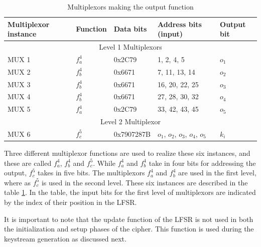 \begin{table}[ht!]
\begin{center}
\small{
\begin{tabular}{|p{2.2cm}|l|p{2cm}|p{2.8cm}|p{1.5cm}|}
\hline 
\textbf{Multiplexor instance}	& \textbf{Function}		& \textbf{Data bits}	& \textbf{Address bits (input)}		& \textbf{Output bit}\\ \hline \hline
\multicolumn{5}{|c|}{Level 1 Multiplexors}\\ \hline \hline
MUX 1 			&	$f_a^4$			& 0x2C79			& 1, 2, 4, 5							& $o_1$\\
MUX 2 			&	$f_b^4$			& 0x6671			& 7, 11, 13, 14						& $o_2$\\
MUX 3 			&	$f_b^4$			& 0x6671			& 16, 20, 22, 25					& $o_3$\\
MUX 4 			&	$f_b^4$			& 0x6671			& 27, 28, 30, 32					& $o_4$\\
MUX 5 			&	$f_a^4$			& 0x2C79			& 33, 42, 43, 45					& $o_5$\\ \hline \hline
\multicolumn{5}{|c|}{Level 2 Multiplexor}\\ \hline \hline
MUX 6 			&	$f_c^5$			& 0x7907287B	& $o_1$, $o_2$, $o_3$, $o_4$, $o_5$		& $k_i$\\ \hline
\end{tabular}}
\end{center}
\caption{Multiplexors making the output function}
\label{tab:muxs}
\end{table}

Three different multiplexor functions are used to realize these six instances, and these are called $f_a^4$, $f_b^4$ and $f_c^5$. While $f_a^4$ and $f_b^4$ take in four bits for addressing the output, $f_c^5$ takes in five bits. The multiplexors $f_a^4$ and $f_b^4$ are used in the first level, where as $f_c^5$ is used in the second level. These six instances are described in the table \ref{tab:muxs}. In the table, the input bits for the first level of multiplexors are indicated by the index of their position in the LFSR.

It is important to note that the update function of the LFSR is not used in both the initialization and setup phases of the cipher. This function is used during the keystream generation as discussed next.\\


